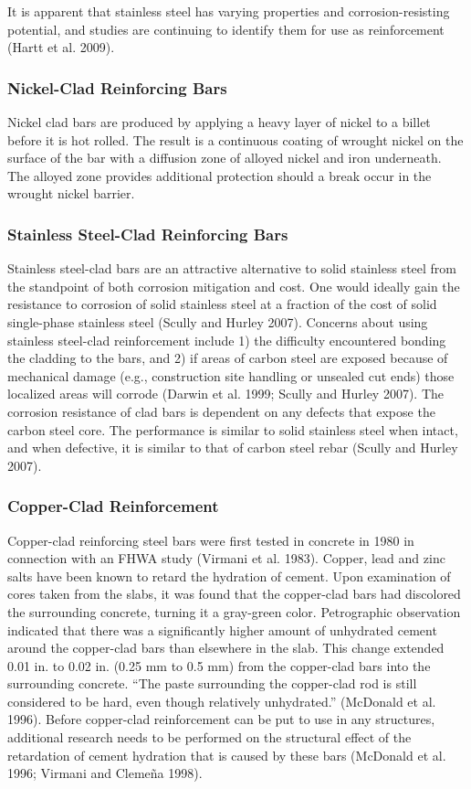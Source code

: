 It is apparent that stainless steel has varying properties and corrosion-resisting potential, and studies are continuing to identify them for use as reinforcement (Hartt et al. 2009).

\subsubsection{Nickel-Clad Reinforcing Bars}
Nickel clad bars are produced by applying a heavy layer of nickel to a billet before it is hot rolled. The result is a continuous coating of wrought nickel on the surface of the bar with a diffusion zone of alloyed nickel and iron underneath. The alloyed zone provides additional protection should a break occur in the wrought nickel barrier.

\subsubsection{Stainless Steel-Clad Reinforcing Bars}
Stainless steel-clad bars are an attractive alternative to solid stainless steel from the standpoint of both corrosion mitigation and cost. One would ideally gain the resistance to corrosion of solid stainless steel at a fraction of the cost of solid single-phase stainless steel (Scully and Hurley 2007). Concerns about using stainless steel-clad reinforcement include 1) the difficulty encountered bonding the cladding to the bars, and 2) if areas of carbon steel are exposed because of mechanical damage (e.g., construction site handling or unsealed cut ends) those localized areas will corrode (Darwin et al. 1999; Scully and Hurley 2007). The corrosion resistance of clad bars is dependent on any defects that expose the carbon steel core. The performance is similar to solid stainless steel when intact, and when defective, it is similar to that of carbon steel rebar (Scully and Hurley 2007).


\subsubsection{Copper-Clad Reinforcement}
Copper-clad reinforcing steel bars were first tested in concrete in 1980 in connection with an FHWA study (Virmani et al. 1983). Copper, lead and zinc salts have been known to retard the hydration of cement. Upon examination of cores taken from the slabs, it was found that the copper-clad bars had discolored the surrounding concrete, turning it a gray-green color. Petrographic observation indicated that there was a significantly higher amount of unhydrated cement around the copper-clad bars than elsewhere in the slab. This change extended 0.01 in.  to 0.02 in. (0.25 mm to 0.5 mm) from the copper-clad bars into the surrounding concrete. “The paste surrounding the copper-clad rod is still considered to be hard, even though relatively unhydrated.” (McDonald et al. 1996). Before copper-clad reinforcement can be put to use in any structures, additional research needs to be performed on the structural effect of the retardation of cement hydration that is caused by these bars (McDonald et al. 1996; Virmani and Clemeña 1998).

